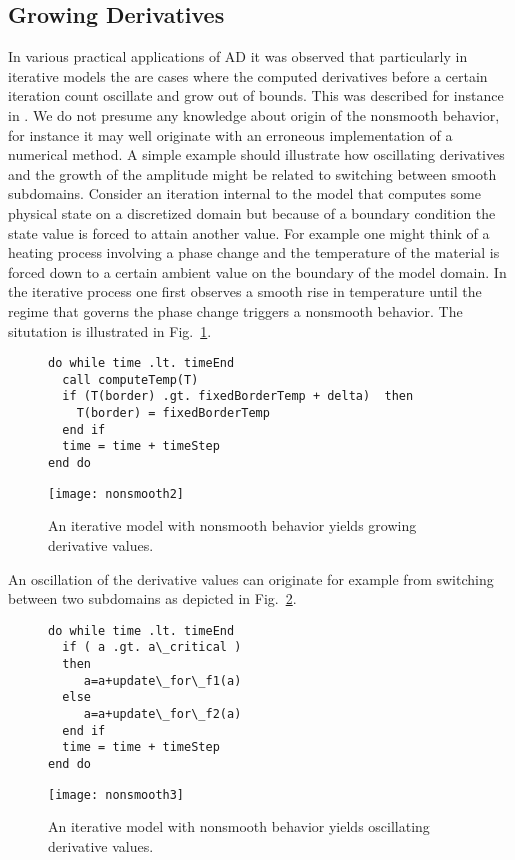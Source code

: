 \documentclass{article}
\newcommand{\reffig}[1]{{Fig.~\ref{#1}}}
\begin{document}
\subsection{Growing Derivatives}\label{sec:GrowingDerivatives}
In various practical applications of AD it was observed that particularly in iterative
models the are cases where the  computed derivatives before a certain iteration count 
oscillate and grow out of bounds. 
This was described for instance in \cite{tfs-delayed}. 
We do not presume any knowledge about origin of the nonsmooth behavior, for instance
it may well originate with an erroneous implementation of a numerical method. 
A simple example should illustrate how oscillating derivatives and the growth 
of the amplitude might be related to switching between smooth subdomains. 
Consider an iteration internal to the model that computes some physical state 
on a discretized domain but because of a boundary condition the state value is 
forced to attain another value. For example one might think of a heating process involving 
a phase change and the temperature of the material is forced down to a certain ambient 
value on the boundary of the model domain. 
In the iterative process one first observes a smooth rise in temperature until the 
regime that governs the phase change triggers a nonsmooth behavior. 
The situtation is illustrated in \reffig{fig:growingExample}.
\begin{figure}
\begin{lstlisting}
do while time .lt. timeEnd
  call computeTemp(T)
  if (T(border) .gt. fixedBorderTemp + delta)  then 
    T(border) = fixedBorderTemp 
  end if
  time = time + timeStep
end do  
\end{lstlisting}
\texttt{[image: nonsmooth2]}
\caption{An iterative model with nonsmooth behavior yields 
growing derivative values.}\label{fig:growingExample} 
\end{figure}
An oscillation of the derivative values can originate for example from 
switching between two subdomains as depicted in  \reffig{fig:oscillatingExample}.
\begin{figure}
\begin{lstlisting}
do while time .lt. timeEnd
  if ( a .gt. a\_critical ) 
  then
     a=a+update\_for\_f1(a)
  else 	
     a=a+update\_for\_f2(a)
  end if
  time = time + timeStep
end do  
\end{lstlisting}
\texttt{[image: nonsmooth3]}
\caption{An iterative model with nonsmooth behavior yields 
oscillating derivative values.}\label{fig:oscillatingExample} 
\end{figure}
\end{document}
